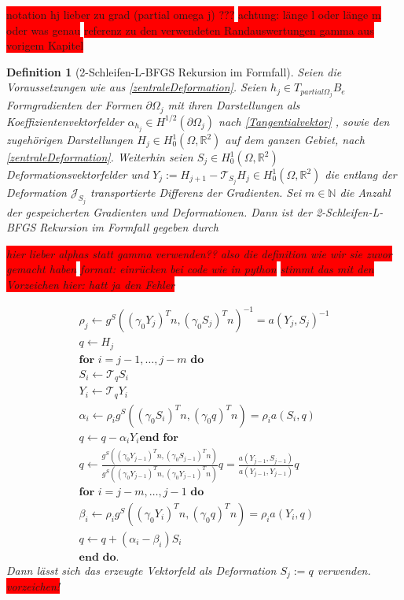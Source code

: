 \documentclass[bibliography=totoc,12pt,a4paper]{scrartcl}
\theoremstyle{exampstyle}
\newtheorem{defi}{Definition}%
\numberwithin{equation}{section}
\begin{document}
\colorbox{red}{notation hj lieber zu grad (partial omega j) ???}
\colorbox{red}{ achtung: länge l oder länge m oder was genau}
\colorbox{red}{referenz zu den verwendeten Randauswertungen gamma aus vorigem Kapitel}

\begin{defi}[2-Schleifen-L-BFGS Rekursion im Formfall]
	Seien die Voraussetzungen wie aus \ref{zentraleDeformation}. Seien $h_j \in T_{partial\Omega_j}B_e$ Formgradienten der Formen $\partial\Omega_j$ mit ihren Darstellungen als Koeffizientenvektorfelder $\alpha_{h_j} \in H^{1/2}(\partial\Omega_j)$ nach \ref{Tangentialvektor} , sowie den zugehörigen Darstellungen $H_j \in H^1_0(\Omega, \mathbb{R}^2)$ auf dem ganzen Gebiet, nach \ref{zentraleDeformation}. Weiterhin seien $S_j \in H^1_0(\Omega, \mathbb{R}^2)$ Deformationsvektorfelder und $Y_j := H_{j+1} - \mathcal{T}_{S_j}H_j \in H^1_0(\Omega, \mathbb{R}^2)$ die entlang der Deformation $\mathcal{J}_{S_j}$ transportierte Differenz der Gradienten. Sei $m \in \mathbb{N}$ die Anzahl der gespeicherten Gradienten und Deformationen. Dann ist der \textit{2-Schleifen-L-BFGS Rekursion im Formfall} gegeben durch 

\colorbox{red}{hier lieber alphas statt gamma verwenden?? also die definition wie wir sie zuvor gemacht haben}
\colorbox{red}{format: einrücken bei code wie in python}
\colorbox{red}{stimmt das mit den Vorzeichen hier: hatt ja den Fehler}

\begin{align*}
	\rho_j \leftarrow g^S((\gamma_0 Y_j)^Tn, (\gamma_0 S_j)^Tn)^{-1} = a(Y_j, S_j)^{-1} \\
		q \leftarrow H_j \\
	\textbf{for } i = j - 1, \dots, j - m \textbf{ do} \\
		S_i \leftarrow \mathcal{T}_q S_i \\
		Y_i \leftarrow \mathcal{T}_q Y_i \\
		\alpha_i \leftarrow \rho_i g^S((\gamma_0 S_i)^Tn, (\gamma_0 q)^T n) = \rho_i a(S_i, q) \\
				q \leftarrow q - \alpha_i Y_i
	\textbf{end for} \\
	q \leftarrow \frac{g^S((\gamma_0 Y_{j-1})^Tn, (\gamma_0 S_{j-1})^Tn)}{g^S((\gamma_0 Y_{j-1})^Tn, (\gamma_0 Y_{j-1})^Tn)}q = \frac{a(Y_{j-1}, S_{j-1})}{a(Y_{j-1}, Y_{j-1})}q \\	
	\textbf{for } i = j - m, \dots, j - 1 \textbf{ do} \\
		\beta_i \leftarrow \rho_i g^S((\gamma_0 Y_i)^Tn, (\gamma_0 q)^Tn) = \rho_i a(Y_i, q) \\
		q \leftarrow q + (\alpha_i - \beta_i)S_i \\
		\textbf{end do.}
\end{align*}
	Dann lässt sich das erzeugte Vektorfeld als Deformation $S_j := q$ verwenden. \colorbox{red}{vorzeichen!}
\end{defi}
\end{document}
